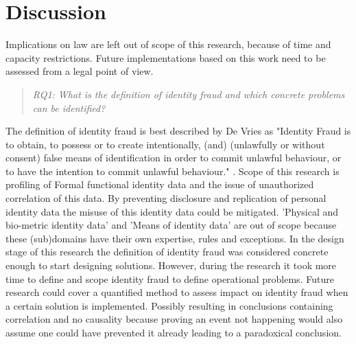 \chapter{Discussion}\label{s:discussion}
Implications on law are left out of scope of this research, because of time and capacity restrictions. Future implementations based on this work need to be assessed from a legal point of view.

\begin{quote}\emph{RQ1: What is the definition of identity fraud and which concrete problems can be identified?}\end{quote}
The definition of identity fraud is best described by De Vries \etal as "Identity Fraud is to obtain, to possess or to create intentionally, (and) (unlawfully or without consent) false means of identification in order to commit unlawful behaviour, or to have the intention to commit unlawful behaviour." \cite{97408536fd1c4f4e9d1615b7a4a4473e}. Scope of this research is profiling of Formal functional identity data and the issue of unauthorized correlation of this data. By preventing disclosure and replication of personal identity data the misuse of this identity data could be mitigated. 'Physical and bio-metric identity data' and 'Means of identity data' are out of scope because these (sub)domains have their own expertise, rules and exceptions. 
In the design stage of this research the definition of identity fraud was considered concrete enough to start designing solutions. However, during the research it took more time to define and scope identity fraud to define operational problems. Future research could cover a quantified method to assess impact on identity fraud when a certain solution is implemented. Possibly resulting in conclusions containing correlation and no causality because proving an event not happening would also assume one could have prevented it already leading to a paradoxical conclusion.\pagebreak

